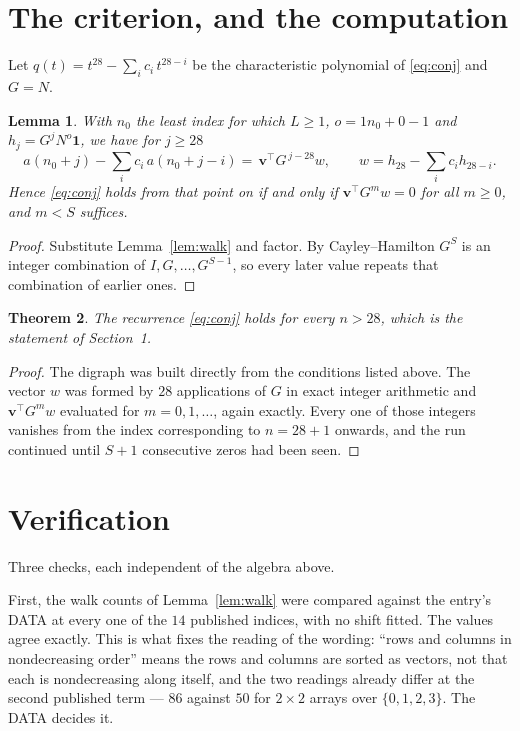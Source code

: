 \documentclass[11pt,a4paper]{article}
\theoremstyle{plain}
\newtheorem{theorem}{Theorem}
\newtheorem{lemma}[theorem]{Lemma}
\theoremstyle{definition}
\begin{document}
\section{The criterion, and the computation}

Let $q(t)=t^{28}-\sum_i c_i\,t^{28-i}$ be the characteristic polynomial of
\eqref{eq:conj} and $G=N$.

\begin{lemma}\label{lem:crit}
With $n_0$ the least index for which $L\ge1$, $o=1n_0+0-1$ and
$h_j=G^{j}N^{o}\mathbf{1}$, we have for $j\ge28$
\[
a(n_0+j)-\sum_i c_i\,a(n_0+j-i)=\,\mathbf{v}^{\!\top}G^{\,j-28}w,
\qquad w=h_{28}-\sum_i c_ih_{28-i} .
\]
Hence \eqref{eq:conj} holds from that point on if and only if
$\mathbf{v}^{\!\top}G^{m}w=0$ for all $m\ge0$, and $m<S$ suffices.
\end{lemma}

\begin{proof}
Substitute Lemma~\ref{lem:walk} and factor. By Cayley--Hamilton $G^{S}$ is an integer
combination of $I,G,\dots,G^{S-1}$, so every later value repeats that combination of
earlier ones.
\end{proof}

\begin{theorem}
The recurrence \eqref{eq:conj} holds for every $n>28$, which is the statement of
Section~1.
\end{theorem}

\begin{proof}
The digraph was built directly from the conditions listed above. The vector $w$ was formed by
$28$ applications of $G$ in exact integer arithmetic and $\mathbf{v}^{\!\top}G^{m}w$
evaluated for $m=0,1,\dots$, again exactly. Every one of those integers vanishes from the
index corresponding to $n=28+1$ onwards, and the run continued until $S+1$ consecutive
zeros had been seen.
\end{proof}

\section{Verification}

Three checks, each independent of the algebra above.

First, the walk counts of Lemma~\ref{lem:walk} were compared against the entry's DATA at
every one of the $14$ published indices, with no shift fitted. The values agree exactly.
This is what fixes the reading of the wording: ``rows and columns in nondecreasing order''
means the rows and columns are sorted as vectors, not that each is nondecreasing along
itself, and the two readings already differ at the second published term --- $86$ against
$50$ for $2\times2$ arrays over $\{0,1,2,3\}$. The DATA decides it.
\end{document}
